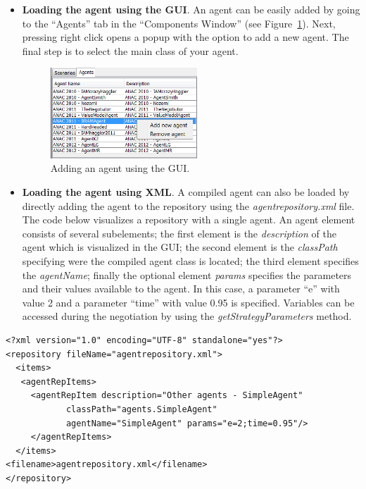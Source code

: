 \documentclass[]{article}
\begin{document}
\begin{itemize}	
\item \textbf{Loading the agent using the GUI}. An agent can be easily added by going to the ``Agents'' tab in the ``Components Window'' (see Figure~\ref{fig:addAgent}). Next, pressing right click opens a popup with the option to add a new agent. The final step is to select the main class of your agent.

\begin{figure}[h] 
	\center
	\includegraphics[width=5.5cm]{media/AddAgent.png}
	\caption{Adding an agent using the GUI.}
	\label{fig:addAgent}
\end{figure}

\item \textbf{Loading the agent using XML}. A compiled agent can also be loaded by directly adding the agent to the repository using the \textit{agentrepository.xml} file. The code below visualizes a repository with a single agent. An agent element consists of several subelements; the first element is the \textit{description} of the agent which is visualized in the GUI; the second element is the \textit{classPath} specifying were the compiled agent class is located; the third element specifies the \textit{agentName}; finally the optional element \textit{params} specifies the parameters and their values available to the agent. In this case, a parameter ``e'' with value 2 and a parameter ``time'' with value 0.95 is specified. Variables can be accessed during the negotiation by using the \textit{getStrategyParameters} method.
\end{itemize}

\begin{lstlisting}
<?xml version="1.0" encoding="UTF-8" standalone="yes"?>
<repository fileName="agentrepository.xml">
  <items>
   <agentRepItems>
     <agentRepItem description="Other agents - SimpleAgent"
			classPath="agents.SimpleAgent"
			agentName="SimpleAgent" params="e=2;time=0.95"/>
     </agentRepItems>
  </items>
<filename>agentrepository.xml</filename>
</repository>
\end{lstlisting}
\end{document}
